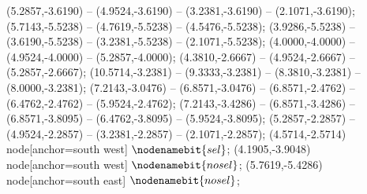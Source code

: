    (5.2857,-3.6190) -- (4.9524,-3.6190) -- (3.2381,-3.6190) -- (2.1071,-3.6190);
   (5.7143,-5.5238) -- (4.7619,-5.5238) -- (4.5476,-5.5238);
   (3.9286,-5.5238) -- (3.6190,-5.5238) -- (3.2381,-5.5238) -- (2.1071,-5.5238);
   (4.0000,-4.0000) -- (4.9524,-4.0000) -- (5.2857,-4.0000);
   (4.3810,-2.6667) -- (4.9524,-2.6667) -- (5.2857,-2.6667);
   (10.5714,-3.2381) -- (9.3333,-3.2381) -- (8.3810,-3.2381) -- (8.0000,-3.2381);
   (7.2143,-3.0476) -- (6.8571,-3.0476) -- (6.8571,-2.4762) -- (6.4762,-2.4762) -- (5.9524,-2.4762);
   (7.2143,-3.4286) -- (6.8571,-3.4286) -- (6.8571,-3.8095) -- (6.4762,-3.8095) -- (5.9524,-3.8095);
   (5.2857,-2.2857) -- (4.9524,-2.2857) -- (3.2381,-2.2857) -- (2.1071,-2.2857);
   (4.5714,-2.5714) node[anchor=south west] {$\nodenamebit{sel}$};
   (4.1905,-3.9048) node[anchor=south west] {$\nodenamebit{nosel}$};
   (5.7619,-5.4286) node[anchor=south east] {$\nodenamebit{nosel}$};
